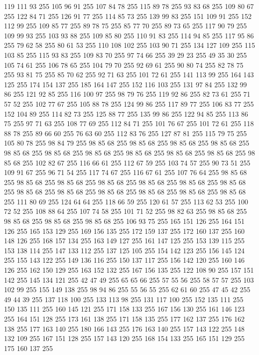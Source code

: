 119 111 93 255 105 96 91 255 107 84 78 255 115 89 78 255 93 83 68 255 109 80 67 255 122 84 71 255 126 91 77 255 114 85 73 255 139 99 83 255 151 109 91 255 152 112 99 255 109 85 77 255 89 78 75 255 85 77 70 255 89 73 65 255 117 90 79 255 109 99 93 255 103 93 88 255 109 85 80 255 110 91 83 255 114 94 85 255 117 95 86 255 79 62 58 255 80 61 53 255 110 108 102 255 103 90 71 255 134 127 109 255 115 103 85 255 115 93 83 255 109 83 70 255 97 74 66 255 39 29 23 255 49 35 30 255 105 74 61 255 106 78 65 255 104 79 70 255 92 69 61 255 90 80 74 255 82 78 75 255 93 81 75 255 85 70 62 255 92 71 63 255 101 72 61 255 141 113 99 255 164 143 125 255 174 154 137 255 185 164 147 255 152 116 103 255 131 97 84 255 132 99 86 255 121 92 85 255 116 100 97 255 98 79 76 255 119 92 86 255 82 73 61 255 71 57 52 255 102 77 67 255 105 88 78 255 124 99 86 255 117 89 77 255 106 83 77 255 152 104 89 255 114 82 73 255
125 88 77 255 135 99 86 255 122 94 85 255 113 86 75 255 97 71 63 255 108 77 69 255 112 84 71 255 101 76 67 255 101 72 61 255 118 88 78 255 89 66 60 255 76 63 60 255 112 83 76 255 127 87 81 255 115 79 75 255 105 80 78 255 98 84 79 255 98 85 68 255 98 85 68 255 98 85 68 255 98 85 68 255 98 85 68 255 98 85 68 255 98 85 68 255 98 85 68 255 98 85 68 255 98 85 68 255 98 85 68 255 102 82 67 255 116 66 61 255 112 67 59 255 103 74 57 255 90 73 51 255 109 91 67 255 96 71 54 255 117 74 67 255 116 67 61 255 107 76 64 255 98 85 68 255 98 85 68 255 98 85 68 255 98 85 68 255 98 85 68 255 98 85 68 255 98 85 68 255 98 85 68 255 98 85 68 255 98 85 68 255 98 85 68 255 98 85 68 255 98 85 68 255 111 80 69 255 124 64 64 255 118 66 59 255 120 61 57 255 113 62 53 255 100 72 52 255 108 88 64 255 107 74 58 255 101 71 52 255 98 82 63 255 98 85 68 255 98 85 68 255 98 85 68 255
98 85 68 255 106 93 75 255 165 151 126 255 164 151 126 255 165 153 129 255 169 156 135 255 172 159 137 255 172 160 137 255 160 148 126 255 168 157 134 255 163 149 127 255 161 147 125 255 153 139 115 255 153 138 114 255 147 133 112 255 137 125 105 255 154 142 123 255 156 145 124 255 155 143 122 255 149 136 116 255 150 137 117 255 156 142 120 255 160 146 126 255 162 150 129 255 163 152 132 255 167 156 135 255 122 108 90 255 157 151 142 255 145 134 121 255 42 47 49 255 65 65 66 255 57 55 56 255 58 57 57 255 103 102 99 255 155 149 138 255 98 94 86 255 55 56 55 255 62 61 60 255 47 45 42 255 49 44 39 255 137 118 100 255 133 113 98 255 131 117 100 255 152 135 111 255 150 135 111 255 160 145 121 255 171 158 133 255 167 156 130 255 161 146 123 255 164 151 128 255 173 161 138 255 171 158 135 255 177 162 137 255 176 162 138 255 177 163 140 255 180 166 143 255 176 163 140 255 157 143 122 255 148 132 109 255 167 151 128 255 157 143 120 255 168 154 133 255 165 151 129 255 175 160 137 255
